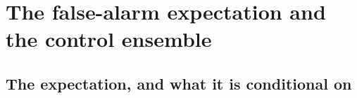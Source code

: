\section{The false-alarm expectation and the control ensemble}
\label{app:falsealarm}

\subsection{The expectation, and what it is conditional on}


